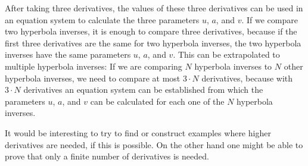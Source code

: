 After taking three derivatives, the values of these three derivatives can be used in an equation system to calculate the three parameters $u$, $a$, and $v$. If we compare two hyperbola inverses, it is enough to compare three derivatives, because if the first three derivatives are the same for two hyperbola inverses, the two hyperbola inverses have the same parameters $u$, $a$, and $v$. This can be extrapolated to multiple hyperbola inverses: If we are comparing $N$ hyperbola inverses to $N$ other hyperbola inverses, we need to compare at most $3\cdot N$ derivatives, because with $3\cdot N$ derivatives an equation system can be established from which the parameters $u$, $a$, and $v$ can be calculated for each one of the $N$ hyperbola inverses.

It would be interesting to try to find or construct examples where higher derivatives are needed, if this is possible. On the other hand one might be able to prove that only a finite number of derivatives is needed. 